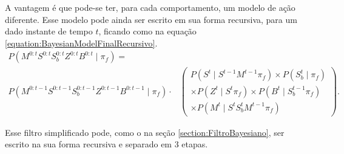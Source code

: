 A vantagem é que pode-se ter, para cada comportamento, um modelo de ação diferente. Esse modelo pode ainda ser escrito em sua forma recursiva, para um dado instante de tempo $ t $, ficando como na equação \ref{equation:BayesianModelFinalRecursivo}.
\begin{equation} \label{equation:BayesianModelFinalRecursivo}
	\begin{split}
        P \left( M^{0: t} S^{0: t} S_b^{0: t} Z^{0: t} B^{0: t} \mid \pi_f \right) = \\
        		P \left( M^{0: t-1} S^{0: t-1} S_b^{0: t-1} Z^{0: t-1} B^{0: t-1} \mid \pi_f \right) \cdot 
        &\left(
            \begin{array}{l}
                P \left( S^t \mid S^{t -1} M^{t -1} \pi_f \right) \times P \left( S_b^t \mid \pi_f \right) \\
                \times P \left( Z^t \mid S^t \pi_f \right) \times P \left( B^t \mid S_b^{t-1} \pi_f \right) \\
                \times P \left( M^t \mid S^t S_b^t M^{t -1} \pi_f \right)
            \end{array}
        \right).
	\end{split}
\end{equation}

Esse filtro simplificado pode, como o na seção \ref{section:FiltroBayesiano}, ser escrito na sua forma recursiva e separado em 3 etapas.


